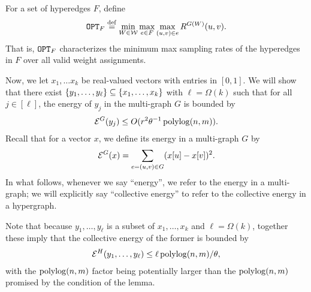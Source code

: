 \documentclass{article}
\begin{document}
\begin{definition}
    For a set of hyperedges $F$, define
    \begin{align*}
        \mathtt{OPT}_F \stackrel{\mathrm{def}}{=}
        \min_{W\in \mathcal{W}} \max_{e\in F}
        \max_{(u,v)\in e} R^{G(W)}(u,v).
    \end{align*}
    That is, $\mathtt{OPT}_F$ characterizes
    the minimum max sampling rates of the hyperedges in $F$
    over all valid weight assignments.
\end{definition}

Now, we let $x_1, \dots x_k$ be real-valued vectors with entries in $[0,1]$. We will show that there exist $\left\{y_1,\ldots,y_\ell \right\}\subseteq \left\{x_1,\ldots,x_k \right\}$
with $\ell = \Omega(k)$ such that for all $j\in [\ell]$,
the energy of $y_j$ in the multi-graph $G$ is bounded by
\begin{align}\label{eq:multiyj}
    \mathcal{E}^G(y_j) \leq O(r^2\theta^{-1}\operatorname{polylog}(n,m)).
\end{align}
Recall that for a vector $x$, we define its energy in a multi-graph $G$ by
\begin{align*}
    \mathcal{E}^G(x) = \sum_{e=(u,v) \in G} (x[u] - x[v])^2.
\end{align*}
In what follows, whenever we say ``energy'', we refer to the energy in a multi-graph;
we will explicitly say ``collective energy'' to refer to the collective energy in a hypergraph.

Note that because $y_1,\ldots,y_{\ell}$ is a subset of
$x_1,\ldots,x_k$ and $\ell=\Omega(k)$, together these imply that
the collective energy of the former is bounded by
\begin{align}\label{eq:colyjs}
    \mathcal{E}^H(y_1,\ldots,y_{\ell}) \leq \ell \operatorname{polylog}(n,m) / \theta,
\end{align}
with the $\operatorname{polylog}(n,m)$ factor being potentially larger than the $\operatorname{polylog}(n,m)$
promised by the condition of the lemma.
\end{document}
